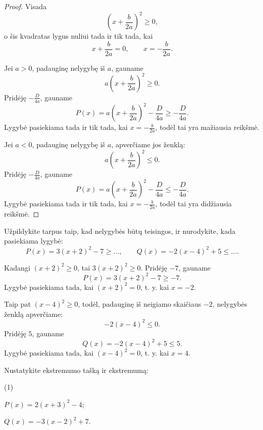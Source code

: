 \documentclass[11pt,a4paper]{scrartcl}
\numberwithin{exercise}{section}
\begin{document}
\begin{proof}

Visada
\[
\left(x+\frac{b}{2a}\right)^2\geq0,
\]
o šis kvadratas lygus nuliui tada ir tik tada, kai
\[
x+\frac{b}{2a}=0,\qquad x=-\frac{b}{2a}.
\]

Jei $a>0$, padauginę nelygybę iš $a$, gauname
\[
a\left(x+\frac{b}{2a}\right)^2\geq0.
\]
Pridėję $-\frac{D}{4a}$, gauname
\[
P(x)=a\left(x+\frac{b}{2a}\right)^2-\frac{D}{4a}
\geq-\frac{D}{4a}.
\]
Lygybė pasiekiama tada ir tik tada, kai
$x=-\frac{b}{2a}$, todėl tai yra mažiausia reikšmė.

Jei $a<0$, padauginę nelygybę iš $a$, apverčiame jos ženklą:
\[
a\left(x+\frac{b}{2a}\right)^2\leq0.
\]
Pridėję $-\frac{D}{4a}$, gauname
\[
P(x)=a\left(x+\frac{b}{2a}\right)^2-\frac{D}{4a}
\leq-\frac{D}{4a}.
\]
Lygybė pasiekiama tada ir tik tada, kai
$x=-\frac{b}{2a}$, todėl tai yra didžiausia reikšmė.

\end{proof}

\begin{example}\label{pv:riba_lygybe}
Užpildykite tarpus taip, kad nelygybės būtų teisingos, ir nurodykite, kada pasiekiama lygybė:
\[
P(x)=3(x+2)^2-7\geq\ldots,
\qquad
Q(x)=-2(x-4)^2+5\leq\ldots.
\]
\end{example}

\begin{solution}
Kadangi $(x+2)^2\geq0$, tai $3(x+2)^2\geq0$. Pridėję $-7$, gauname
\[
P(x)=3(x+2)^2-7\geq-7.
\]
Lygybė pasiekiama tada, kai $(x+2)^2=0$, t. y. kai $x=-2$.

Taip pat $(x-4)^2\geq0$, todėl, padauginę iš neigiamo skaičiaus $-2$, nelygybės ženklą apverčiame:
\[
-2(x-4)^2\leq0.
\]
Pridėję $5$, gauname
\[
Q(x)=-2(x-4)^2+5\leq5.
\]
Lygybė pasiekiama tada, kai $(x-4)^2=0$, t. y. kai $x=4$.

\end{solution}



\begin{example}\label{pv:pavidalas}

Nustatykite ekstremumo tašką ir ekstremumą:

\begin{tasks}[label=\alph*),label-width=1.4em,label-offset=0.1em,item-indent=1.5em](1)

\task $P(x)=2(x+3)^2-4$;

\task $Q(x)=-3(x-2)^2+7$.

\end{tasks}

\end{example}
\end{document}
